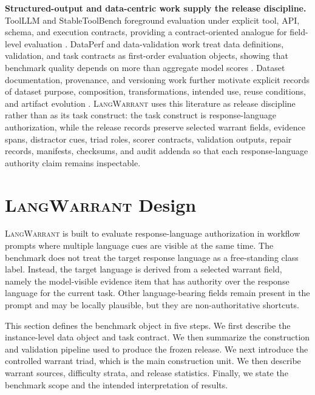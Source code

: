 \documentclass[10pt,conference]{IEEEtran}
\newcommand{\dataset}{\textsc{LangWarrant}}
\begin{document}
\textbf{Structured-output and data-centric work supply the release discipline.}
ToolLLM and StableToolBench foreground evaluation under explicit tool, API, schema, and execution contracts, providing a contract-oriented analogue for field-level evaluation \cite{qin2024toolllm,guo2024stabletoolbench}. DataPerf and data-validation work treat data definitions, validation, and task contracts as first-order evaluation objects, showing that benchmark quality depends on more than aggregate model scores \cite{mazumder2023dataperf,breck2019datavalidation}. Dataset documentation, provenance, and versioning work further motivate explicit records of dataset purpose, composition, transformations, intended use, reuse conditions, and artifact evolution \cite{gebru2021datasheets,pushkarna2022datacards,herschel2017provenance,bhattacherjee2015datasetversioning}. \dataset{} uses this literature as release discipline rather than as its task construct: the task construct is response-language authorization, while the release records preserve selected warrant fields, evidence spans, distractor cues, triad roles, scorer contracts, validation outputs, repair records, manifests, checksums, and audit addenda so that each response-language authority claim remains inspectable.


\section{\dataset{} Design}

\dataset{} is built to evaluate response-language authorization in workflow prompts where multiple language cues are visible at the same time. The benchmark does not treat the target response language as a free-standing class label. Instead, the target language is derived from a selected warrant field, namely the model-visible evidence item that has authority over the response language for the current task. Other language-bearing fields remain present in the prompt and may be locally plausible, but they are non-authoritative shortcuts.

This section defines the benchmark object in five steps. We first describe the instance-level data object and task contract. We then summarize the construction and validation pipeline used to produce the frozen release. We next introduce the controlled warrant triad, which is the main construction unit. We then describe warrant sources, difficulty strata, and release statistics. Finally, we state the benchmark scope and the intended interpretation of results.
\end{document}
